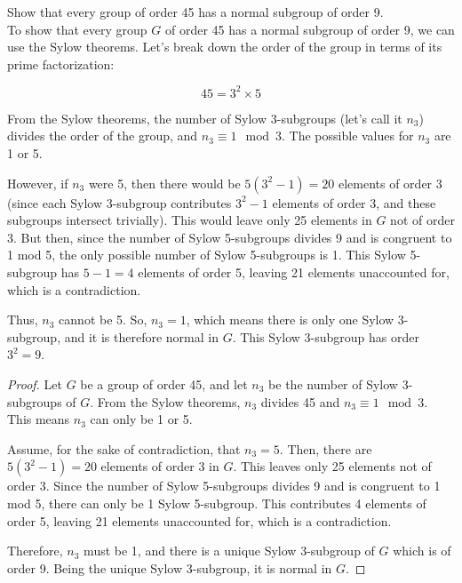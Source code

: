 \documentclass[12pt]{amsart}
\theoremstyle{definition}
\numberwithin{equation}{section}
\theoremstyle{plain}
\begin{document}
\vspace*{20pt}
\begin{exercise}{13}
Show that every group of order 45 has a normal subgroup of order 9.\\

To show that every group \( G \) of order 45 has a normal subgroup of order 9, we can use the Sylow theorems. Let's break down the order of the group in terms of its prime factorization:

\[ 45 = 3^2 \times 5 \]

From the Sylow theorems, the number of Sylow 3-subgroups (let's call it \( n_3 \)) divides the order of the group, and \( n_3 \equiv 1 \mod 3 \). The possible values for \( n_3 \) are 1 or 5.

However, if \( n_3 \) were 5, then there would be \( 5(3^2 - 1) = 20 \) elements of order 3 (since each Sylow 3-subgroup contributes \( 3^2 - 1 \) elements of order 3, and these subgroups intersect trivially). This would leave only 25 elements in \( G \) not of order 3. But then, since the number of Sylow 5-subgroups divides 9 and is congruent to 1 mod 5, the only possible number of Sylow 5-subgroups is 1. This Sylow 5-subgroup has \( 5 - 1 = 4 \) elements of order 5, leaving 21 elements unaccounted for, which is a contradiction.

Thus, \( n_3 \) cannot be 5. So, \( n_3 = 1 \), which means there is only one Sylow 3-subgroup, and it is therefore normal in \( G \). This Sylow 3-subgroup has order \( 3^2 = 9 \).

\begin{proof}
Let \( G \) be a group of order 45, and let \( n_3 \) be the number of Sylow 3-subgroups of \( G \). From the Sylow theorems, \( n_3 \) divides 45 and \( n_3 \equiv 1 \mod 3 \). This means \( n_3 \) can only be 1 or 5.

Assume, for the sake of contradiction, that \( n_3 = 5 \). Then, there are \( 5(3^2 - 1) = 20 \) elements of order 3 in \( G \). This leaves only 25 elements not of order 3. Since the number of Sylow 5-subgroups divides 9 and is congruent to 1 mod 5, there can only be 1 Sylow 5-subgroup. This contributes 4 elements of order 5, leaving 21 elements unaccounted for, which is a contradiction.

Therefore, \( n_3 \) must be 1, and there is a unique Sylow 3-subgroup of \( G \) which is of order 9. Being the unique Sylow 3-subgroup, it is normal in \( G \).
\end{proof}
\end{exercise}
\end{document}
